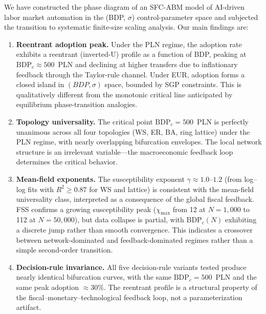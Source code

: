 \documentclass[12pt,a4paper]{article}
\begin{document}
We have constructed the phase diagram of an SFC-ABM model of AI-driven labor
market automation in the (BDP, $\sigma$) control-parameter space and
subjected the transition to systematic finite-size scaling analysis. Our main
findings are:

\begin{enumerate}
    \item \textbf{Reentrant adoption peak.} Under the PLN regime, the adoption
    rate exhibits a reentrant (inverted-U) profile as a function of BDP, peaking
    at $\mathrm{BDP}_c \approx 500$~PLN and declining at higher transfers due to
    inflationary feedback through the Taylor-rule channel. Under EUR, adoption
    forms a closed island in $(BDP, \sigma)$ space, bounded by SGP constraints.
    This is qualitatively different from the monotonic critical line anticipated
    by equilibrium phase-transition analogies.

    \item \textbf{Topology universality.} The critical point
    $\mathrm{BDP}_c = 500$~PLN is perfectly unanimous across all four
    topologies (WS, ER, BA, ring lattice) under the PLN regime, with nearly
    overlapping bifurcation envelopes. The local network structure is an
    irrelevant variable---the macroeconomic feedback loop determines the
    critical behavior.

    \item \textbf{Mean-field exponents.} The susceptibility exponent
    $\gamma \approx 1.0$--$1.2$ (from log--log fits with $R^2 \geq 0.87$
    for WS and lattice) is consistent with the mean-field universality class,
    interpreted as a consequence of the global fiscal feedback. FSS confirms a
    growing susceptibility peak ($\chi_{\max}$ from 12 at $N = 1{,}000$ to 112
    at $N = 50{,}000$), but data collapse is partial, with
    $\mathrm{BDP}_c(N)$ exhibiting a discrete jump rather than smooth
    convergence. This indicates a crossover between network-dominated and
    feedback-dominated regimes rather than a simple second-order transition.

    \item \textbf{Decision-rule invariance.} All five decision-rule variants
    tested produce nearly identical bifurcation curves, with the same
    $\mathrm{BDP}_c = 500$~PLN and the same peak adoption $\approx 30\%$. The
    reentrant profile is a structural property of the
    fiscal--monetary--technological feedback loop, not a parameterization
    artifact.
\end{enumerate}
\end{document}
